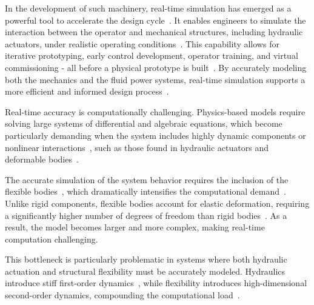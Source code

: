 In the development of such machinery, real-time simulation has emerged as a powerful tool to accelerate the design cycle~\cite{jaiswal_2021_efficiency,khadim_2014_targeting}. It enables engineers to simulate the interaction between the operator and mechanical structures, including hydraulic actuators, under realistic operating conditions~\cite{jaiswal_2021_efficiency,KHADIM2023105405}. This capability allows for iterative prototyping, early control development, operator training, and virtual commissioning - all before a physical prototype is built~\cite{khadim_2014_targeting,jaiswal_2021_realtime,rodrguez_2020_hardware}. By accurately modeling both the mechanics and the fluid power systems, real-time simulation supports a more efficient and informed design process~\cite{jarkkorahikainen_2018_combined}.

Real-time accuracy is computationally challenging. Physics-based models require solving large systems of differential and algebraic equations, which become particularly demanding when the system includes highly dynamic components or nonlinear interactions~\cite{khadim2024simulation}, such as those found in hydraulic actuators and deformable bodies~\cite{gil_2016_flexible}.

The accurate simulation of the system behavior requires the inclusion of the flexible bodies~\cite{zwlfer_2019_a}, which dramatically intensifies the computational demand~\cite{gil_2016_flexible}. Unlike rigid components, flexible bodies account for elastic deformation, requiring a significantly higher number of degrees of freedom than rigid bodies~\cite{go_2024_a}. As a result, the model becomes larger and more complex, making real-time computation challenging.

This bottleneck is particularly problematic in systems where both hydraulic actuation and structural flexibility must be accurately modeled. Hydraulics introduce stiff first-order dynamics~\cite{jaiswal_2021_comparing,khadim2024simulation}, while flexibility introduces high-dimensional second-order dynamics, compounding the computational load~\cite{han_2020_simulation}.


